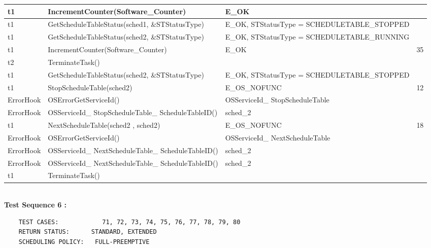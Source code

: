 \documentclass[10pt]{article}
\newlength{\Li}\settowidth{\Li}{Running}
\newlength{\Lii}\setlength{\Lii}{7cm}
\newlength{\Liiii}\setlength{\Liiii}{0.9cm}
\newlength{\Liii}\setlength{\Liii}{\textwidth} \addtolength{\Liii}{-\Li} \addtolength{\Liii}{-\Lii} \addtolength{\Liii}{-\Liiii}
\begin{document}
\begin{supertabular}{|p{\Li}|p{\Lii}|p{\Liii}|p{\Liiii}|}
	t1		& IncrementCounter(Software\_Counter)										& E\_OK												& \\ \hline
	t1		& GetScheduleTableStatus(sched1, \&STStatusType)							& E\_OK, STStatusType = SCHEDULETABLE\_STOPPED		& \\ \hline
	t1		& GetScheduleTableStatus(sched2, \&STStatusType)							& E\_OK, STStatusType = SCHEDULETABLE\_RUNNING		& \\ \hline
	t1		& IncrementCounter(Software\_Counter)										& E\_OK												& 35 \\ \hline
	t2		& TerminateTask()														& 													& \\ \hline
	t1		& GetScheduleTableStatus(sched2, \&STStatusType)							& E\_OK, STStatusType = SCHEDULETABLE\_STOPPED		& \\ \hline
	t1		& StopScheduleTable(sched2)												& E\_OS\_NOFUNC										& 12 \\ \hline
	ErrorHook	& OSErrorGetServiceId()													& OSServiceId\_ StopScheduleTable						& \\ \hline
	ErrorHook	& OSServiceId\_ StopScheduleTable\_ ScheduleTableID()						& sched\_2											& \\ \hline
	t1		& NextScheduleTable(sched2 , sched2)										& E\_OS\_NOFUNC										& 18\\ \hline
	ErrorHook	& OSErrorGetServiceId()													& OSServiceId\_ NextScheduleTable						& \\ \hline
	ErrorHook	& OSServiceId\_ NextScheduleTable\_ ScheduleTableID()						& sched\_2											& \\ \hline
	ErrorHook	& OSServiceId\_ NextScheduleTable\_ ScheduleTableID()						& sched\_2											& \\ \hline

	t1		& TerminateTask()														& 													& \\ \hline
	\end{supertabular}\\
	
	
	\textbf{Test Sequence 6 :}
	\begin{lstlisting}
	TEST CASES:		       71, 72, 73, 74, 75, 76, 77, 78, 79, 80
	RETURN STATUS:	  	STANDARD, EXTENDED
	SCHEDULING POLICY:   FULL-PREEMPTIVE
	\end{lstlisting}
	
\end{document}
